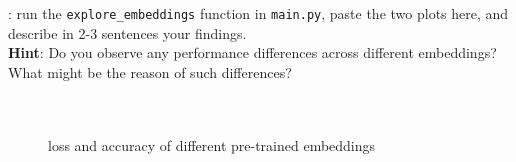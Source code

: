 \noindent \todo{}: run the \texttt{explore\_embeddings} function in \texttt{main.py}, paste the two plots here, and describe in 2-3 sentences your findings.\\
\noindent \textbf{Hint}: Do you observe any performance differences across different embeddings? What might be the reason of such differences? 
\\\\
\noindent {\color{red}{your plot and answer:}}\\
\begin{figure}[h] 
   \centering
   \hfill
   \caption{loss and accuracy of different pre-trained embeddings}
\end{figure} \\

